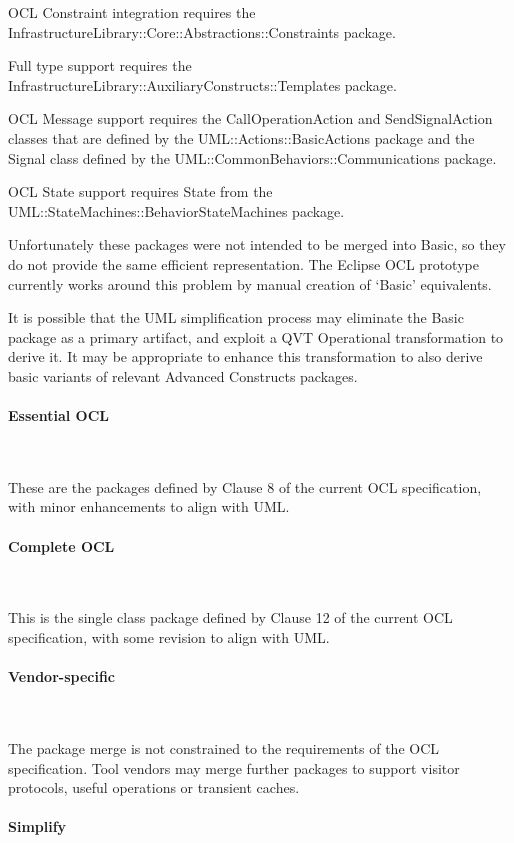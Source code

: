 \documentclass{eceasst}
\begin{document}
OCL Constraint integration requires the InfrastructureLibrary::Core::Abstractions::Constraints package.

Full type support requires the InfrastructureLibrary::AuxiliaryConstructs::Templates package.

OCL Message support requires the CallOperationAction and SendSignalAction classes that are defined by the UML::Actions::BasicActions package and the Signal class defined by the UML::CommonBehaviors::Communications package.

OCL State support requires State from the UML::StateMachines::BehaviorStateMachines package.

Unfortunately these packages were not intended to be merged into Basic, so they do not provide the same efficient representation. The Eclipse OCL prototype currently works around this problem by manual creation of `Basic' equivalents.

It is possible that the UML simplification process\cite{UML-simple} may eliminate the Basic package as a primary artifact, and exploit a QVT Operational transformation to derive it. It may be appropriate to enhance this transformation to also derive basic variants of relevant Advanced Constructs packages.

\paragraph{Essential OCL}~

These are the packages defined by Clause 8 of the current OCL specification, with minor enhancements to align with UML. 

\paragraph{Complete OCL}~

This is the single class package defined by Clause 12 of the current OCL specification, with some revision to align with UML. 

\paragraph{Vendor-specific}~

The package merge is not constrained to the requirements of the OCL specification. Tool vendors may merge further packages to support visitor protocols, useful operations or transient caches.

\paragraph{Simplify}~
\end{document}
